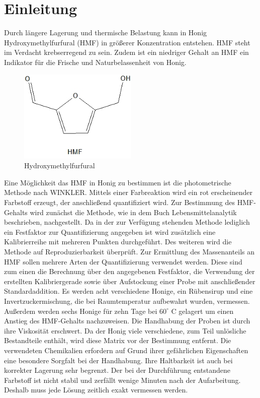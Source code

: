 \chapter{Einleitung} 

Durch längere Lagerung und thermische Belastung kann in Honig Hydroxymethylfurfural (HMF) in größerer Konzentration entstehen. HMF steht im Verdacht krebserregend zu sein. Zudem ist ein niedriger Gehalt an HMF ein Indikator für die Frische und Naturbelassenheit von Honig.
\begin{figure}[htbp]
	\centering
		\includegraphics[width=0.5\textwidth]{../Bilder/HMF.jpg}
	\caption{Hydroxymethylfurfural}
	\label{fig:HMF}
\end{figure}
\newline
Eine Möglichkeit das HMF in Honig zu bestimmen ist die photometrische Methode nach WINKLER. Mittels einer Farbreaktion wird ein rot erscheinender Farbstoff erzeugt, der anschließend quantifiziert wird. Zur  Bestimmung des HMF-Gehalts wird zunächst die Methode, wie in dem Buch Lebensmittelanalytik beschrieben, nachgestellt. Da in der zur Verfügung stehenden Methode lediglich ein Festfaktor zur Quantifizierung angegeben ist wird zusätzlich eine Kalibrierreihe mit mehreren Punkten durchgeführt. Des weiteren wird die Methode auf Reproduzierbarkeit überprüft. Zur Ermittlung des Massenanteils an HMF sollen mehrere Arten der Quantifizierung verwendet werden. Diese sind zum einen die Berechnung über den angegebenen Festfaktor, die Verwendung der erstellten Kalibriergerade sowie über Aufstockung einer Probe mit anschließender Standardaddition. Es werden acht verschiedene Honige, ein Rübensirup und eine Invertzuckermischung, die bei Raumtemperatur aufbewahrt wurden, vermessen. Außerdem werden sechs Honige für zehn Tage bei $60^\circ$ C gelagert um einen Anstieg des HMF-Gehalts nachzuweisen. Die Handhabung der Proben ist durch ihre Viskosität erschwert. Da der Honig viele verschiedene, zum Teil unlösliche Bestandteile enthält, wird diese Matrix vor der Bestimmung entfernt. Die verwendeten Chemikalien erfordern auf Grund ihrer gefährlichen Eigenschaften eine besondere Sorgfalt bei der Handhabung. Ihre Haltbarkeit ist auch bei korrekter Lagerung sehr begrenzt. Der bei der Durchführung entstandene Farbstoff ist nicht stabil und zerfällt wenige Minuten nach der Aufarbeitung. Deshalb muss jede Lösung zeitlich exakt vermessen werden. %